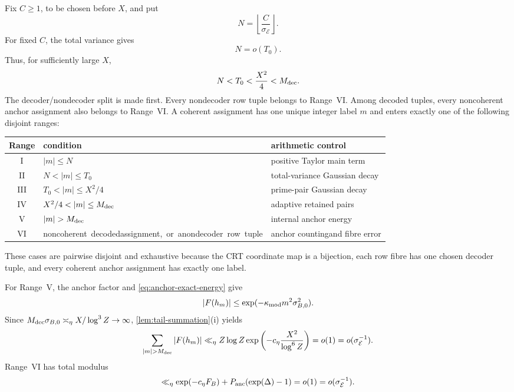 Fix $C\geq1$, to be chosen before $X$, and put
\begin{equation}
\label{eq:N-major}
 N=\left\lfloor\frac{C}{\sigma_{\mathcal E}}\right\rfloor.
\end{equation}
For fixed $C$, the total variance gives
\begin{equation}
\label{eq:N-below-full}
 N=o(T_0).
\end{equation}
Thus, for sufficiently large $X$,
\[
 N<T_0<\frac{X^2}{4}<M_{\rm dec}.
\]
The decoder/nondecoder split is made first. Every nondecoder row tuple belongs to Range~VI. Among decoded tuples, every noncoherent anchor assignment also belongs to Range~VI. A coherent assignment has one unique integer label $m$ and enters exactly one of the following disjoint ranges:
\begin{center}
\begin{tabular}{@{}c p{4.6cm} p{5.6cm}@{}}
\toprule
Range & condition & arithmetic control \\
\midrule
I & $|m|\leq N$ & positive Taylor main term \\
II & $N<|m|\leq T_0$ & total-variance Gaussian decay \\
III & $T_0<|m|\leq X^2/4$ & prime-pair Gaussian decay \\
IV & $X^2/4<|m|\leq M_{\rm dec}$ & adaptive retained pairs \\
V & $|m|>M_{\rm dec}$ & internal anchor energy \\
VI & \mbox{noncoherent decoded}\newline \mbox{assignment, or a}\newline \mbox{nondecoder row tuple} & anchor counting\newline and fibre error \\
\bottomrule
\end{tabular}
\end{center}
These cases are pairwise disjoint and exhaustive because the CRT coordinate map is a bijection, each row fibre has one chosen decoder tuple, and every coherent anchor assignment has exactly one label.

For Range~V, the anchor factor and \cref{eq:anchor-exact-energy} give
\[
 |F(h_m)|\leq\exp(-\kappa_{\rm mod}m^2\sigma_{B,0}^2).
\]
Since $M_{\rm dec}\sigma_{B,0}\asymp_\eta X/\log^3Z\to\infty$, \cref{lem:tail-summation}(i) yields
\begin{equation}
\label{eq:anchor-tail-total}
 \sum_{|m|>M_{\rm dec}}|F(h_m)|
 \ll_\eta Z\log Z\exp\left(-c_\eta\frac{X^2}{\log^6Z}\right)
 =o(1)=o(\sigma_{\mathcal E}^{-1}).
\end{equation}
Range~VI has total modulus
\begin{equation}
\label{eq:terminal-error-total}
 \ll_\eta\exp(-c_\eta F_B)+P_{\rm anc}(\exp(\Delta)-1)
 =o(1)=o(\sigma_{\mathcal E}^{-1}).
\end{equation}


